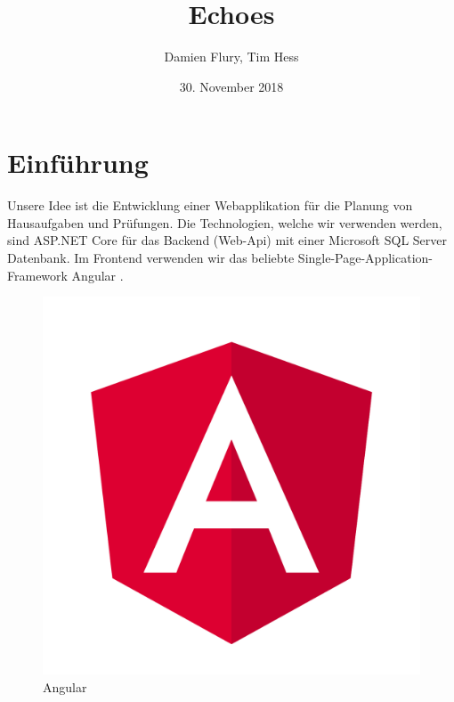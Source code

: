 \documentclass[a4paper, titlepage]{article}
\title{Echoes}
\author{Damien Flury, Tim Hess}
\date{30. November 2018}
\begin{document}
    \maketitle
    \tableofcontents
    \newpage

    \section{Einführung}
    Unsere Idee ist die Entwicklung einer Webapplikation für die Planung von Hausaufgaben
    und Prüfungen. Die Technologien, welche wir verwenden werden, sind ASP.NET Core \cite{Dotnet}
    für das Backend (Web-Api) mit einer Microsoft SQL Server Datenbank. Im Frontend 
    verwenden wir das beliebte Single-Page-Application-Framework Angular \cite{Angular}.
    
    \begin{figure}
        \includegraphics[width=\textwidth]{angular}
        \caption{Angular}
    \end{figure}
\end{document}
